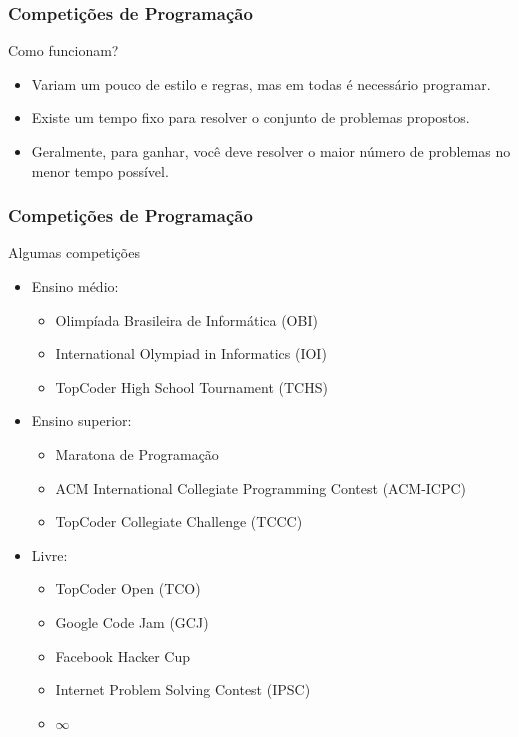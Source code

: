 \begin{frame}
\frametitle{Competições de Programação}
\begin{block}{Como funcionam?}
\begin{itemize}
	\item Variam um pouco de estilo e regras, mas em todas é necessário programar.
	\item Existe um tempo fixo para resolver o conjunto de problemas propostos.
	\item Geralmente, para ganhar, você deve resolver o maior número de problemas no menor tempo possível.
\end{itemize}
\end{block}

\end{frame}
\begin{frame}
\frametitle{Competições de Programação}
\begin{block}{Algumas competições}
\begin{itemize}
	\item Ensino médio: 
	\begin{itemize}
		\item Olimpíada Brasileira de Informática (OBI)
		\item International Olympiad in Informatics (IOI)
		\item TopCoder High School Tournament (TCHS)
	\end{itemize}
	\item Ensino superior: 
	\begin{itemize}
		\item Maratona de Programação
		\item ACM International Collegiate Programming Contest (ACM-ICPC)
		\item TopCoder Collegiate Challenge (TCCC)
	\end{itemize}
	\item Livre: 
	\begin{itemize}
		\item TopCoder Open (TCO)
		\item Google Code Jam (GCJ)
		\item Facebook Hacker Cup
		\item Internet Problem Solving Contest (IPSC)
		\item $\infty$
	\end{itemize}
\end{itemize}
\end{block}
\end{frame}
